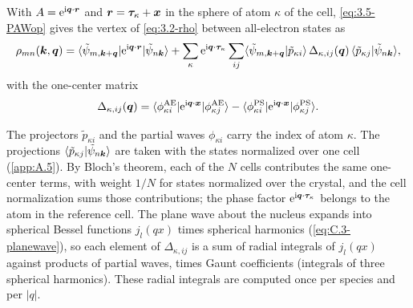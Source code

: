 \begin{keyresult}
With $A = \mathrm{e}^{\mathrm{i}\bm{q}\cdot\bm{r}}$ and $\bm{r} = \bm{\tau}_\kappa + \bm{x}$ in the sphere of atom $\kappa$ of the cell, \cref{eq:3.5-PAWop} gives the vertex of \cref{eq:3.2-rho} between all-electron states as
\begin{equation}
  \rho_{mn}(\bm{k}, \bm{q}) = \langle\tilde\psi_{m,\bm{k}+\bm{q}}|\mathrm{e}^{\mathrm{i}\bm{q}\cdot\bm{r}}|\tilde\psi_{n\bm{k}}\rangle
  + \sum_\kappa\mathrm{e}^{\mathrm{i}\bm{q}\cdot\bm{\tau}_\kappa}\sum_{ij}\langle\tilde\psi_{m,\bm{k}+\bm{q}}|\tilde p_{\kappa i}\rangle\,\Delta_{\kappa,ij}(\bm{q})\,\langle\tilde p_{\kappa j}|\tilde\psi_{n\bm{k}}\rangle ,
  \label{eq:3.5-rhoAE}
\end{equation}
with the one-center matrix
\begin{equation}
  \Delta_{\kappa,ij}(\bm{q}) = \langle\phi^{\mathrm{AE}}_{\kappa i}|\mathrm{e}^{\mathrm{i}\bm{q}\cdot\bm{x}}|\phi^{\mathrm{AE}}_{\kappa j}\rangle - \langle\phi^{\mathrm{PS}}_{\kappa i}|\mathrm{e}^{\mathrm{i}\bm{q}\cdot\bm{x}}|\phi^{\mathrm{PS}}_{\kappa j}\rangle .
  \label{eq:E.2-onecentre}
\end{equation}
\end{keyresult}
The projectors $\tilde p_{\kappa i}$ and the partial waves $\phi_{\kappa i}$ carry the index of atom $\kappa$. The projections $\langle\tilde p_{\kappa j}|\tilde\psi_{n\bm{k}}\rangle$ are taken with the states normalized over one cell (\cref{app:A.5}). By Bloch's theorem, each of the $N$ cells contributes the same one-center terms, with weight $1/N$ for states normalized over the crystal, and the cell normalization sums those contributions; the phase factor $\mathrm{e}^{\mathrm{i}\bm{q}\cdot\bm{\tau}_\kappa}$ belongs to the atom in the reference cell. The plane wave about the nucleus expands into spherical Bessel functions $j_l(qx)$ times spherical harmonics (\cref{eq:C.3-planewave}), so each element of $\Delta_{\kappa,ij}$ is a sum of radial integrals of $j_l(qx)$ against products of partial waves, times Gaunt coefficients (integrals of three spherical harmonics). These radial integrals are computed once per species and per $|q|$.

